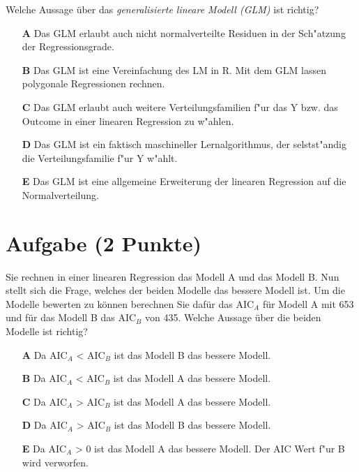 \documentclass[a4paper, 10pt]{scrartcl}\usepackage[]{graphicx}\usepackage[]{xcolor}
\begin{document}
Welche Aussage {\"u}ber das \textit{generalisierte lineare Modell (GLM)} ist richtig?  



\begin{enumerate}
\item [\textbf{A} \msquare] Das GLM erlaubt auch nicht normalverteilte Residuen in der Sch{"a}tzung der Regressionsgrade.
\item [\textbf{B} \msquare] Das GLM ist eine Vereinfachung des LM in R. Mit dem GLM lassen polygonale Regressionen rechnen.
\item [\textbf{C} \msquare] Das GLM erlaubt auch weitere Verteilungsfamilien f{"u}r das Y bzw. das Outcome in einer linearen Regression zu w{"a}hlen.
\item [\textbf{D} \msquare] Das GLM ist ein faktisch maschineller Lernalgorithmus, der selstst{"a}ndig die Verteilungsfamilie f{"u}r Y w{"a}hlt.
\item [\textbf{E} \msquare] Das GLM ist eine allgemeine Erweiterung der linearen Regression auf die Normalverteilung.
\end{enumerate}

\section{Aufgabe \hfill (2 Punkte)}



Sie rechnen in einer linearen Regression das Modell A und das Modell B. Nun
stellt sich die Frage, welches der beiden Modelle das bessere Modell
ist. Um die Modelle bewerten zu k{\"o}nnen berechnen Sie daf{\"u}r das AIC$_A$ f{\"u}r
Modell A mit 653 und f{\"u}r das Modell B das AIC$_B$ von
435. Welche Aussage {\"u}ber die beiden Modelle ist richtig?



\begin{enumerate}
\item [\textbf{A} \msquare] Da AIC$_A$ < AIC$_B$ ist das Modell B das bessere Modell.
\item [\textbf{B} \msquare] Da AIC$_A$ < AIC$_B$ ist das Modell A das bessere Modell.
\item [\textbf{C} \msquare] Da AIC$_A$ > AIC$_B$ ist das Modell A das bessere Modell.
\item [\textbf{D} \msquare] Da AIC$_A$ > AIC$_B$ ist das Modell B das bessere Modell.
\item [\textbf{E} \msquare] Da AIC$_A$ > 0 ist das Modell A das bessere Modell. Der AIC Wert f{"u}r B wird verworfen.
\end{enumerate}
\end{document}
